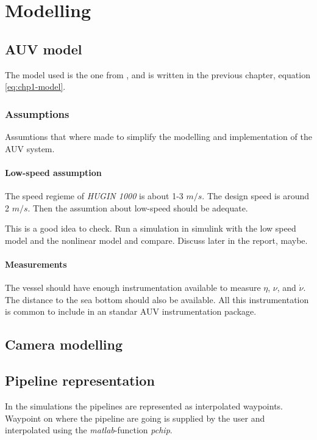 \chapter{Modelling}


\section{AUV model}
	The model used is the one from \cite{fossen}, and is written in the previous chapter, equation \eqref{eq:chp1-model}.
	
	\subsection{Assumptions}
	Assumtions that where made to simplify the modelling and implementation of the AUV system.
		\subsubsection{Low-speed assumption}
		The speed regieme of \textit{HUGIN 1000} is about 1-3 $m/s$. The design speed is around 2 $m/s$. Then the assumtion about low-speed should be adequate.  

		This is a good idea to check. Run a simulation in simulink with the low speed model and the nonlinear model and compare. Discuss later in the report, maybe.
		
		\subsubsection{Measurements}
		The vessel should have enough instrumentation available to measure $\eta$, $\nu$, and $\dot{\nu}$. The distance to the sea bottom should also be available. All this instrumentation is common to include in an standar AUV instrumentation package. 


\section{Camera modelling}
	
	


\section{Pipeline representation}
	In the simulations the pipelines are represented as interpolated waypoints. Waypoint on where the pipeline are going is supplied by the user and interpolated using the \textit{matlab}-function \textit{pchip}. 


